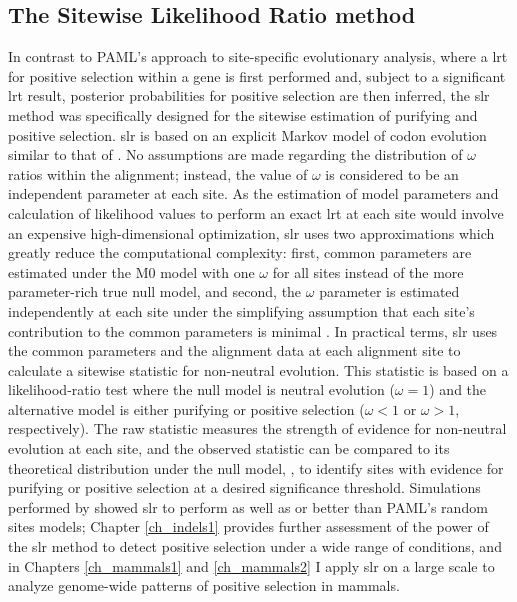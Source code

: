 \subsection{The Sitewise Likelihood Ratio method}

In contrast to PAML's approach to site-specific evolutionary analysis,
where a \ac{lrt} for positive selection within a gene is first
performed and, subject to a significant \ac{lrt} result, \sw posterior
probabilities for positive selection are then inferred, the \ac{slr}
method \citep{Massingham2005} was specifically designed for the
sitewise estimation of purifying and positive selection. \ac{slr} is
based on an explicit Markov model of codon evolution similar to that
of \citet{Goldman1994a}. No assumptions are made regarding the
distribution of $\omega$ ratios within the alignment; instead, the
value of $\omega$ is considered to be an independent parameter at each
site. As the estimation of model parameters and calculation of
likelihood values to perform an exact \ac{lrt} at each site would
involve an expensive high-dimensional optimization, \ac{slr} uses two
approximations which greatly reduce the computational complexity:
first, common parameters are estimated under the M0 model
\citep{Yang2000CodonSubstitution} with one $\omega$ for all sites
instead of the more parameter-rich true null model, and second, the
\sw $\omega$ parameter is estimated independently at each site under
the simplifying assumption that each site's contribution to the common
parameters is minimal \citep{Massingham2005}. In practical terms,
\ac{slr} uses the common parameters and the alignment data at each
alignment site to calculate a sitewise statistic for non-neutral
evolution. This statistic is based on a likelihood-ratio test where
the null model is neutral evolution ($\omega=1$) and the alternative
model is either purifying or positive selection ($\omega<1$ or
$\omega>1$, respectively). The raw statistic measures the strength of
evidence for non-neutral evolution at each site, and the observed
statistic can be compared to its theoretical distribution under the
null model, \chisq, to identify sites with evidence for purifying or
positive selection at a desired significance threshold. Simulations
performed by \citet{Massingham2005} showed \ac{slr} to perform as well
as or better than PAML’s random sites models; Chapter \ref{ch_indels1}
provides further assessment of the power of the \ac{slr} method to
detect \sw positive selection under a wide range of conditions, and in
Chapters \ref{ch_mammals1} and \ref{ch_mammals2} I apply \ac{slr} on a
large scale to analyze genome-wide patterns of \sw positive selection
in mammals.

